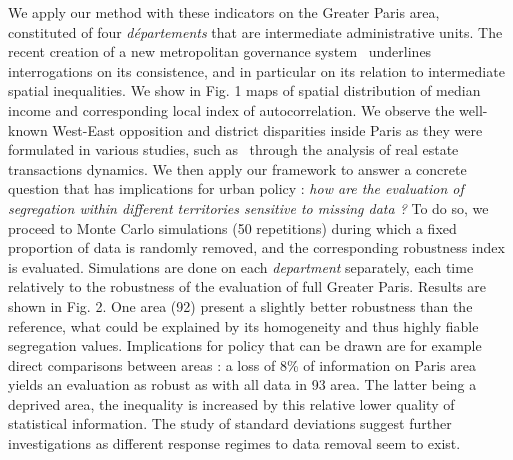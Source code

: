 \documentclass[runningheads,a4paper]{llncs2e/llncs}
\begin{document}
We apply our method with these indicators on the Greater Paris area, constituted of four \emph{d{\'e}partements} that are intermediate administrative units. The recent creation of a new metropolitan governance system~\cite{gilli2009paris} underlines interrogations on its consistence, and in particular on its relation to intermediate spatial inequalities. We show in Fig. 1 maps of spatial distribution of median income and corresponding local index of autocorrelation. We observe the well-known West-East opposition and district disparities inside Paris as they were formulated in various studies, such as~\cite{guerois2009dynamique} through the analysis of real estate transactions dynamics. We then apply our framework to answer a concrete question that has implications for urban policy : \textit{how are the evaluation of segregation within different territories sensitive to missing data ?} To do so, we proceed to Monte Carlo simulations (50 repetitions) during which a fixed proportion of data is randomly removed, and the corresponding robustness index is evaluated. Simulations are done on each \emph{department} separately, each time relatively to the robustness of the evaluation of full Greater Paris. Results are shown in Fig. 2. One area (92) present a slightly better robustness than the reference, what could be explained by its homogeneity and thus highly fiable segregation values. Implications for policy that can be drawn are for example direct comparisons between areas : a loss of 8\% of information on Paris area yields an evaluation as robust as with all data in 93 area. The latter being a deprived area, the inequality is increased by this relative lower quality of statistical information. The study of standard deviations suggest further investigations as different response regimes to data removal seem to exist.
\end{document}
